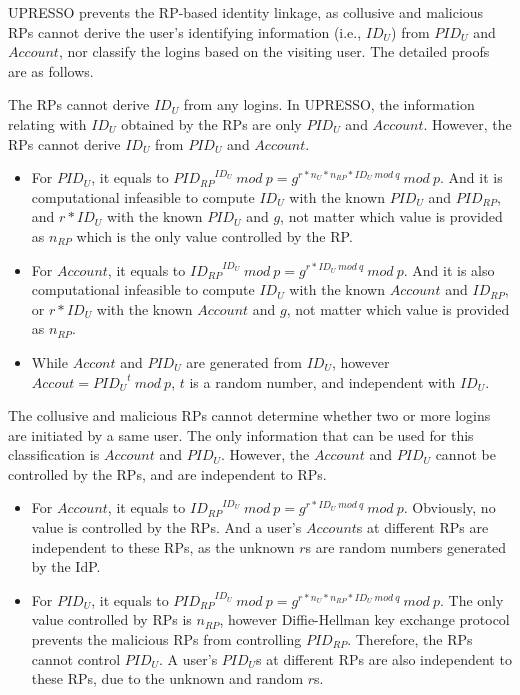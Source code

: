 UPRESSO prevents the RP-based identity linkage, as collusive and malicious RPs cannot derive the user's identifying information (i.e., $ID_U$) from $PID_U$ and $Account$, nor classify the logins based on the visiting user.
The detailed proofs are as follows.

The RPs cannot derive $ID_U$ from any logins. In UPRESSO, the information relating with $ID_U$ obtained by the RPs are only $PID_{U}$ and $Account$. However, the RPs cannot derive $ID_U$ from $PID_U$ and $Account$.
\begin{itemize}
  \item For $PID_U$, it equals to ${PID_{RP}}^{ID_U}\ mod\ p=g^{r*n_U*n_{RP}*ID_U\ mod\ q}\ mod\ p$. And it is computational infeasible to compute $ID_U$ with the known $PID_U$ and $PID_{RP}$, and $r*ID_U$ with the known $PID_U$ and $g$, not matter which value is provided  as $n_{RP}$ which is the only value controlled by the RP.
  \item For $Account$, it equals to ${ID_{RP}}^{ID_U}\ mod\ p=g^{r*ID_U\ mod\ q}\ mod\ p$. And it is also computational infeasible to compute $ID_U$ with the known $Account$ and $ID_{RP}$, or $r*ID_U$ with the known $Account$ and $g$, not matter which value is provided  as $n_{RP}$.
  \item While $Accont$ and $PID_U$ are generated from $ID_U$, however $Accout={PID_U}^t\ mod\ p$, $t$ is a random number, and independent with $ID_U$.
\end{itemize}

The collusive and malicious RPs cannot determine whether two or more logins are initiated by a same user. The only information  that can be used for this
classification is $Account$ and $PID_U$.
However,  the $Account$ and $PID_U$ cannot be controlled by the RPs, and are independent to RPs.
\begin{itemize}
  \item For $Account$, it equals to ${ID_{RP}}^{ID_U}\ mod\ p=g^{r*ID_U\ mod\ q}\ mod\ p$. Obviously, no value is controlled by the RPs. And a user's $Account$s at different RPs are independent to these RPs, as the unknown $r$s are   random numbers generated by the IdP.
  \item For $PID_U$, it equals to ${PID_{RP}}^{ID_U}\ mod\ p=g^{r*n_U*n_{RP}*ID_U\ mod\ q}\ mod\ p$. The only value controlled by RPs is $n_{RP}$, however Diffie-Hellman key exchange protocol prevents the malicious RPs from controlling $PID_{RP}$. Therefore, the RPs cannot control $PID_U$. A user's $PID_U$s at different RPs are also independent to these RPs, due to the unknown and random $r$s.
\end{itemize}




